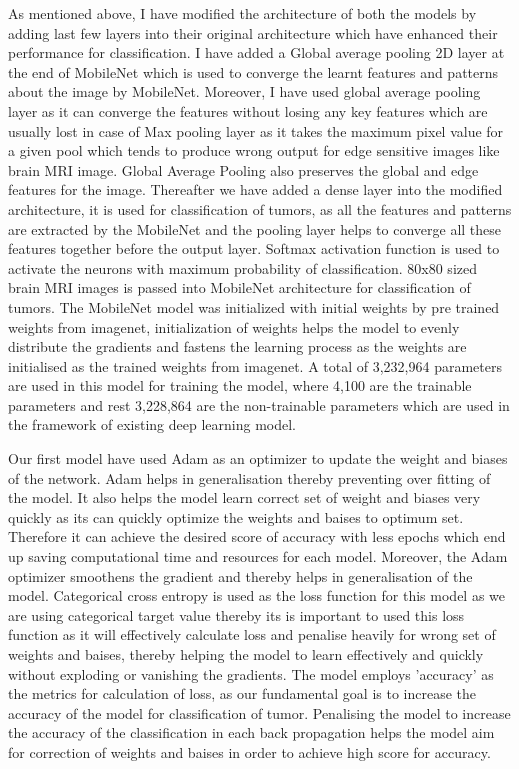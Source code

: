 \documentclass[12pt, a4paper,twoside]{report}
\theoremstyle{plain} %
\theoremstyle{definition} %
\theoremstyle{remark} %
\numberwithin{equation}{chapter}
\begin{document}
As mentioned above, I have modified the architecture of both the models by adding last few layers into their original architecture which have enhanced their performance for classification. I have added a Global average pooling 2D layer at the end of MobileNet which is used to converge the learnt features and patterns about the image by MobileNet. Moreover, I have used global average pooling layer as it can converge the features without losing any key features which are usually lost in case of Max pooling layer as it takes the maximum pixel value for a given pool which tends to produce wrong output for edge sensitive images like brain MRI image. Global Average Pooling also preserves the global and edge features for the image. Thereafter we have added a dense layer into the modified architecture, it is used for classification of tumors, as all the features and patterns are extracted by the MobileNet and the pooling layer helps to converge all these features together before the output layer. Softmax activation function is used to activate the neurons with maximum probability of classification. 80x80 sized brain MRI images is passed into MobileNet architecture for classification of tumors. The MobileNet model was initialized with initial weights by pre trained weights from imagenet, initialization of weights helps the model to evenly distribute the gradients and fastens the learning process as the weights are initialised as the trained weights from imagenet. A total of 3,232,964 parameters are used in this model for training the model, where 4,100 are the trainable parameters and rest 3,228,864 are the non-trainable parameters which are used in the framework of existing deep learning model. 

Our first model have used Adam as an optimizer to update the weight and biases of the network. Adam helps in generalisation thereby preventing over fitting of the model. It also helps the model learn correct set of weight and biases very quickly as its can quickly optimize the weights and baises to optimum set. Therefore it can achieve the desired score of accuracy with less epochs which end up saving computational time and resources for each model. Moreover, the Adam optimizer smoothens the gradient and thereby helps in generalisation of the model. Categorical cross entropy is used as the loss function for this model as we are using categorical target value thereby its is important to used this loss function as it will effectively calculate loss and penalise heavily for wrong set of weights and baises, thereby helping the model to learn effectively and quickly without exploding or vanishing the gradients. The model employs 'accuracy' as the metrics for calculation of loss, as our fundamental goal is to increase the accuracy of the model for classification of tumor. Penalising the model to increase the accuracy of the classification in each back propagation helps the model aim for correction of weights and baises in order to achieve high score for accuracy. 
\end{document}
